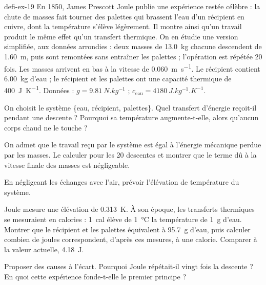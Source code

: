 \begin{blocEdition}{defi-ex-19}
En 1850, James Prescott Joule publie une expérience restée célèbre : la chute de masses fait tourner des palettes qui
brassent l'eau d'un récipient en cuivre, dont la température s'élève légèrement. Il montre ainsi qu'un travail produit
le même effet qu'un transfert thermique. On en étudie une version simplifiée, aux données arrondies : deux masses de
\qty{13,0}{kg} chacune descendent de \qty{1,60}{m}, puis sont remontées sans entraîner les palettes ; l'opération est
répétée 20 fois. Les masses arrivent en bas à la vitesse de \qty{0,060}{m.s^{-1}}. Le récipient contient \qty{6,00}{kg}
d'eau ; le récipient et les palettes ont une capacité thermique de \qty{400}{J.K^{-1}}.
Données : $g=\qty{9,81}{N.kg^{-1}}$ ; $c_\mathrm{eau}=\qty{4180}{J.kg^{-1}.K^{-1}}$.
\begin{questions}
\item On choisit le système \{eau, récipient, palettes\}. Quel transfert d'énergie reçoit-il pendant une descente ?
Pourquoi sa température augmente-t-elle, alors qu'aucun corps chaud ne le touche ?
\item On admet que le travail reçu par le système est égal à l'énergie mécanique perdue par les masses. Le calculer
pour les 20 descentes et montrer que le terme dû à la vitesse finale des masses est négligeable.
\item En négligeant les échanges avec l'air, prévoir l'élévation de température du système.
\item Joule mesure une élévation de \qty{0,313}{K}. À son époque, les transferts thermiques se mesuraient en calories :
\qty{1}{cal} élève de \qty{1}{\degreeCelsius} la température de \qty{1}{g} d'eau. Montrer que le récipient et les palettes
équivalent à \qty{95,7}{g} d'eau, puis calculer combien de joules correspondent, d'après ces mesures, à une calorie.
Comparer à la valeur actuelle, \qty{4,18}{J}.
\item Proposer des causes à l'écart. Pourquoi Joule répétait-il vingt fois la descente ? En quoi cette expérience
fonde-t-elle le premier principe ?
\end{questions}
\end{blocEdition}

